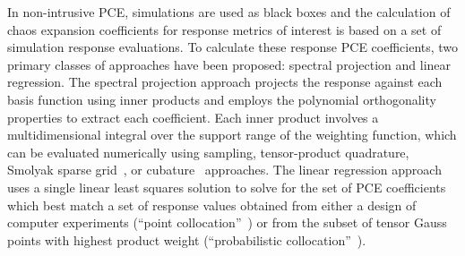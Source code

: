 In non-intrusive PCE, simulations are used as black boxes and the
calculation of chaos expansion coefficients for response metrics of
interest is based on a set of simulation response evaluations.  To
calculate these response PCE coefficients, two primary classes of
approaches have been proposed: spectral projection and linear
regression.  The spectral projection approach projects the response
against each basis function using inner products and employs the
polynomial orthogonality properties to extract each coefficient.  Each
inner product involves a multidimensional integral over the support
range of the weighting function, which can be evaluated numerically
using sampling, tensor-product quadrature, Smolyak sparse
grid~\cite{Smolyak_63}, or cubature~\cite{stroud} approaches.  The
linear regression approach uses a single linear least squares solution
to solve for the set of PCE coefficients which best match a set of
response values obtained from either a design of computer experiments
(``point collocation''~\cite{pt_colloc1}) or from the subset of tensor
Gauss points with highest product weight (``probabilistic
collocation''~\cite{Tat95}).

